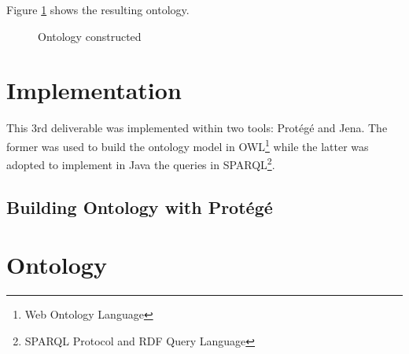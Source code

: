 \documentclass[a4paper,10pt]{article}
\begin{document}
Figure \ref{fig:onto} shows the resulting ontology.

\begin{figure}[h!]
 \centering
 \caption{Ontology constructed}
 \label{fig:onto}
\end{figure}



\section{Implementation}

This 3rd deliverable was implemented within two tools: Protégé\cite{protege} and Jena\cite{jena}. The former was used to build the ontology model in OWL\footnote{Web Ontology Language} while the latter was adopted to implement in Java the queries in SPARQL\footnote{SPARQL Protocol and RDF Query Language}.

\subsection{Building Ontology with Protégé}





\appendix

\section{Ontology}





\end{document}
